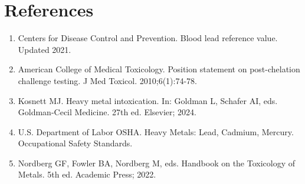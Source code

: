 \section*{References}
\begin{enumerate}
  \item Centers for Disease Control and Prevention. Blood lead reference value. Updated 2021.
  \item American College of Medical Toxicology. Position statement on post-chelation challenge testing. J Med Toxicol. 2010;6(1):74-78.
  \item Kosnett MJ. Heavy metal intoxication. In: Goldman L, Schafer AI, eds. Goldman-Cecil Medicine. 27th ed. Elsevier; 2024.
  \item U.S. Department of Labor OSHA. Heavy Metals: Lead, Cadmium, Mercury. Occupational Safety Standards.
  \item Nordberg GF, Fowler BA, Nordberg M, eds. Handbook on the Toxicology of Metals. 5th ed. Academic Press; 2022.
\end{enumerate}

\clearpage